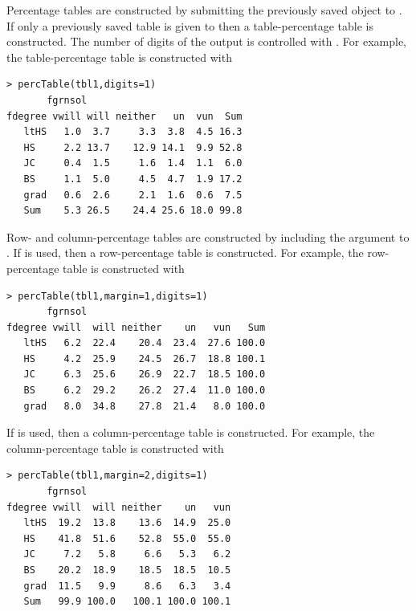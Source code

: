 \documentclass[10pt,openany]{book}\usepackage[]{graphicx}\usepackage[]{color}
\makeatletter
\newenvironment{kframe}{%
 \def\at@end@of@kframe{}%
 \ifinner\ifhmode%
  \def\at@end@of@kframe{\end{minipage}}%
  \begin{minipage}{\columnwidth}%
 \fi\fi%
 \def\FrameCommand##1{\hskip\@totalleftmargin \hskip-\fboxsep
 \colorbox{shadecolor}{##1}\hskip-\fboxsep
     \hskip-\linewidth \hskip-\@totalleftmargin \hskip\columnwidth}%
 \MakeFramed {\advance\hsize-\width
   \@totalleftmargin\z@ \linewidth\hsize
   \@setminipage}}%
 {\par\unskip\endMakeFramed%
 \at@end@of@kframe}
\newenvironment{knitrout}{}{} %
\makeatother
\begin{document}
Percentage tables are constructed by submitting the previously saved  object to .  If only a previously saved table is given to  then a table-percentage table is constructed.  The number of digits of the output is controlled with .  For example, the table-percentage table is constructed with
\begin{knitrout}
\color{fgcolor}\begin{kframe}
\begin{verbatim}
> percTable(tbl1,digits=1)
       fgrnsol
fdegree vwill will neither   un  vun  Sum
   ltHS   1.0  3.7     3.3  3.8  4.5 16.3
   HS     2.2 13.7    12.9 14.1  9.9 52.8
   JC     0.4  1.5     1.6  1.4  1.1  6.0
   BS     1.1  5.0     4.5  4.7  1.9 17.2
   grad   0.6  2.6     2.1  1.6  0.6  7.5
   Sum    5.3 26.5    24.4 25.6 18.0 99.8
\end{verbatim}
\end{kframe}
\end{knitrout}
Row- and column-percentage tables are constructed by including the  argument to .  If  is used, then a row-percentage table is constructed.  For example, the row-percentage table is constructed with
\begin{knitrout}
\color{fgcolor}\begin{kframe}
\begin{verbatim}
> percTable(tbl1,margin=1,digits=1)
       fgrnsol
fdegree vwill  will neither    un   vun   Sum
   ltHS   6.2  22.4    20.4  23.4  27.6 100.0
   HS     4.2  25.9    24.5  26.7  18.8 100.1
   JC     6.3  25.6    26.9  22.7  18.5 100.0
   BS     6.2  29.2    26.2  27.4  11.0 100.0
   grad   8.0  34.8    27.8  21.4   8.0 100.0
\end{verbatim}
\end{kframe}
\end{knitrout}
If  is used, then a column-percentage table is constructed.  For example, the column-percentage table is constructed with
\begin{knitrout}
\color{fgcolor}\begin{kframe}
\begin{verbatim}
> percTable(tbl1,margin=2,digits=1)
       fgrnsol
fdegree vwill  will neither    un   vun
   ltHS  19.2  13.8    13.6  14.9  25.0
   HS    41.8  51.6    52.8  55.0  55.0
   JC     7.2   5.8     6.6   5.3   6.2
   BS    20.2  18.9    18.5  18.5  10.5
   grad  11.5   9.9     8.6   6.3   3.4
   Sum   99.9 100.0   100.1 100.0 100.1
\end{verbatim}
\end{kframe}
\end{knitrout}
\end{document}
